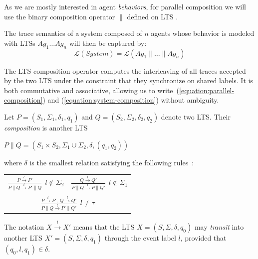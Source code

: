 As we are mostly interested in agent \emph{behaviors}, for parallel composition we will use the binary composition operator $\parallel$ defined on LTS \cite{Giannakopoulou:1999, Magee:1999}. 

The trace semantics of a system composed of $n$ agents whose behavior is modeled with LTSs $Ag_1 \ldots Ag_n$ will then be captured by:
\begin{equation}
\mathcal{L}(System) = \mathcal{L}(Ag_1 \parallel \ldots \parallel Ag_n)
\label{equation:system-composition}
\end{equation}

The LTS composition operator computes the interleaving of all traces accepted by the two LTS under the constraint that they synchronize on shared labels. It is both commutative and associative, allowing us to write~(\ref{equation:parallel-composition}) and (\ref{equation:system-composition}) without ambiguity. 

\begin{definition}
Let $P = (S_1,\Sigma_1,\delta_1,q_{1})$ and $Q = (S_2,\Sigma_2,\delta_2,q_{2})$ denote two LTS. Their \emph{composition} is another LTS 
\begin{center}
$P \parallel Q = (S_1 \times S_2,\Sigma_1\cup\Sigma_2,\delta,(q_1,q_2))$
\end{center}
\noindent where $\delta$ is the smallest relation satisfying the following rules~\cite{Giannakopoulou:1999}:

\begin{center}
\begin{tabular}{cc}
$\frac{\displaystyle P \stackrel{l}{\longrightarrow} P'}{\displaystyle P \parallel Q \stackrel{l}{\longrightarrow} P' \parallel Q}~~l \notin \Sigma_2$ &
$\frac{\displaystyle Q \stackrel{l}{\longrightarrow} Q'}{\displaystyle P \parallel Q \stackrel{l}{\longrightarrow} P \parallel Q'}~~l \notin \Sigma_1$ \\
 & \\
\multicolumn{2}{c}{$\frac{\displaystyle P \stackrel{l}{\longrightarrow} P',~Q \stackrel{l}{\longrightarrow} Q'}{\displaystyle P \parallel Q \stackrel{l}{\longrightarrow} P' \parallel Q'}~~l \neq \tau$} \\
\end{tabular}
\end{center}
The notation $X \stackrel{l}{\longrightarrow} X'$ means that the LTS $X = (S,\Sigma,\delta,q_0)$ may \emph{transit} into another LTS $X' = (S,\Sigma,\delta,q_1)$ through the event label $l$, provided that $(q_0,l,q_1) \in \delta$. 
\label{definition:lts-composition}
\end{definition}

